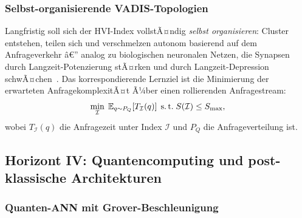 ﻿\documentclass[12pt,a4paper]{article}
\begin{document}
\subsubsection{Selbst-organisierende VADIS-Topologien}

Langfristig soll sich der HVI-Index vollstÃ¤ndig
\emph{selbst organisieren}: Cluster entstehen, teilen sich
und verschmelzen autonom basierend auf dem Anfrageverkehr â€”
analog zu biologischen neuronalen Netzen, die Synapsen
durch Langzeit-Potenzierung stÃ¤rken und durch
Langzeit-Depression schwÃ¤chen~\cite{bliss1993synaptic}.
Das korrespondierende Lernziel ist die Minimierung der
erwarteten AnfragekomplexitÃ¤t Ã¼ber einen rollierenden
Anfragestream:
\begin{equation}
  \min_{\mathcal{I}} \;\mathbb{E}_{q \sim P_Q}\!\left[
    T_{\mathcal{I}}(q)
  \right]
  \;\text{s.\,t.}\; S(\mathcal{I}) \leq S_{\max},
\end{equation}
wobei $T_{\mathcal{I}}(q)$ die Anfragezeit unter Index
$\mathcal{I}$ und $P_Q$ die Anfrageverteilung ist.

\subsection{Horizont IV: Quantencomputing und
            post-klassische Architekturen}
\label{sub:horizont4}

\subsubsection{Quanten-ANN mit Grover-Beschleunigung}
\end{document}
